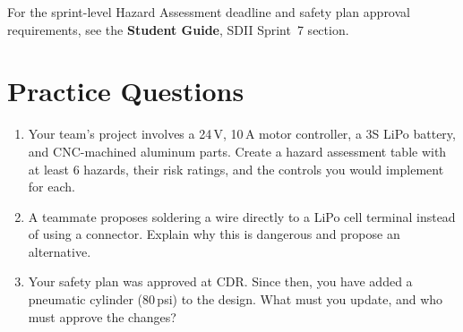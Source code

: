 \begin{tipbox}
For the sprint-level Hazard Assessment deadline and safety plan approval requirements, see the \textbf{Student Guide}, SDII Sprint~7 section.
\end{tipbox}

\section{Practice Questions}
\begin{enumerate}[leftmargin=1.5em]
\item Your team's project involves a 24\,V, 10\,A motor controller, a 3S LiPo battery, and CNC-machined aluminum parts. Create a hazard assessment table with at least 6 hazards, their risk ratings, and the controls you would implement for each.
\item A teammate proposes soldering a wire directly to a LiPo cell terminal instead of using a connector. Explain why this is dangerous and propose an alternative.
\item Your safety plan was approved at CDR. Since then, you have added a pneumatic cylinder (80\,psi) to the design. What must you update, and who must approve the changes?
\end{enumerate}


